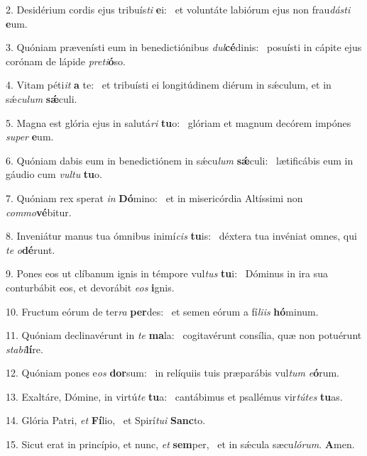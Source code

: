2. Desidérium cordis ejus tribuís\textit{ti} \textbf{e}i: \ast\  et voluntáte labiórum ejus non frau\textit{dás}\textit{ti} \textbf{e}um.\

3. Quóniam prævenísti eum in benedictiónibus \textit{dul}\textbf{cé}dinis: \ast\  posuísti in cápite ejus corónam de lápide \textit{pre}\textit{ti}\textbf{ó}so.\

4. Vitam péti\textit{it} \textbf{a} te: \ast\  et tribuísti ei longitúdinem diérum in sǽculum, et in sǽ\textit{cu}\textit{lum} \textbf{sǽ}culi.\

5. Magna est glória ejus in salutá\textit{ri} \textbf{tu}o: \ast\  glóriam et magnum decórem impónes \textit{su}\textit{per} \textbf{e}um.\

6. Quóniam dabis eum in benedictiónem in sǽcu\textit{lum} \textbf{sǽ}culi: \ast\  lætificábis eum in gáudio cum \textit{vul}\textit{tu} \textbf{tu}o.\

7. Quóniam rex sperat \textit{in} \textbf{Dó}mino: \ast\  et in misericórdia Altíssimi non \textit{com}\textit{mo}\textbf{vé}bitur.\

8. Inveniátur manus tua ómnibus inimí\textit{cis} \textbf{tu}is: \ast\  déxtera tua invéniat omnes, qui \textit{te} \textit{o}\textbf{dé}runt.\

9. Pones eos ut clíbanum ignis in témpore vul\textit{tus} \textbf{tu}i: \ast\  Dóminus in ira sua conturbábit eos, et devorábit \textit{e}\textit{os} \textbf{i}gnis.\

10. Fructum eórum de ter\textit{ra} \textbf{per}des: \ast\  et semen eórum a fí\textit{li}\textit{is} \textbf{hó}minum.\

11. Quóniam declinavérunt in \textit{te} \textbf{ma}la: \ast\  cogitavérunt consília, quæ non potuérunt \textit{sta}\textit{bi}\textbf{lí}re.\

12. Quóniam pones e\textit{os} \textbf{dor}sum: \ast\  in relíquiis tuis præparábis vul\textit{tum} \textit{e}\textbf{ó}rum.\

13. Exaltáre, Dómine, in virtú\textit{te} \textbf{tu}a: \ast\  cantábimus et psallémus vir\textit{tú}\textit{tes} \textbf{tu}as.\

14. Glória Patri, \textit{et} \textbf{Fí}lio, \ast\  et Spirí\textit{tu}\textit{i} \textbf{Sanc}to.\

15. Sicut erat in princípio, et nunc, \textit{et} \textbf{sem}per, \ast\  et in sǽcula sæcu\textit{ló}\textit{rum}. \textbf{A}men.\

